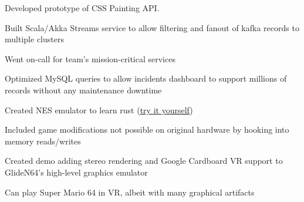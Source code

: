 \documentclass[12pt]{jmichaud-resume}
\begin{document}
\begin{minipage}[t]{11.5cm}
\begin{tightemize}
	\item Developed prototype of CSS Painting API.
\end{tightemize}
\sectionsep
{} \hfill {}


\begin{tightemize}
	\item Built Scala/Akka Streams service to allow filtering and fanout of kafka records to multiple clusters
	\item Went on-call for team's mission-critical services
	
\end{tightemize}
\sectionsepp
{}\hfill{}

\begin{tightemize}
	\item Optimized MySQL queries to allow incidents dashboard to support millions of records without any maintenance downtime
\end{tightemize}
\sectionsep

 \hfill {}

\sectionsep

 \hfill {}



 \hfill
{}
\begin{tightemize}
	\item Created NES emulator to learn rust (\href{http://justinmichaud.com}{\underline{try it yourself}})
	\item Included game modifications not possible on original hardware by hooking into memory reads/writes
\end{tightemize}

\sectionsep
{} \hfill
{}
\begin{tightemize}
	\item Created demo adding stereo rendering and Google Cardboard VR support to GlideN64's high-level graphics emulator
	\item Can play Super Mario 64 in VR, albeit with many graphical artifacts
\end{tightemize}

\end{minipage}
\end{document}

